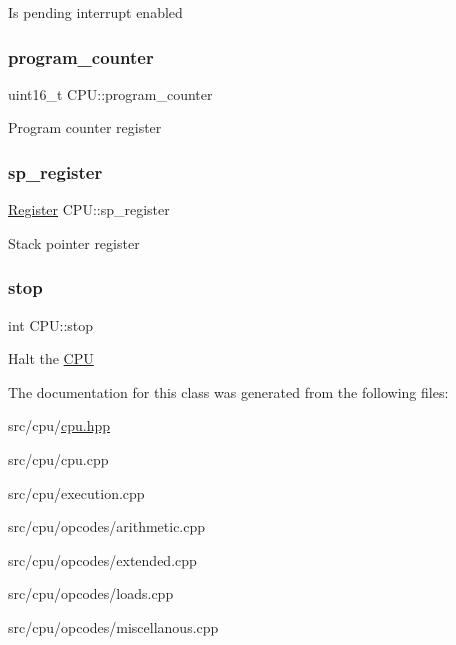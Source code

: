 Is pending interrupt enabled \mbox{\label{classCPU_a4714cc8907d24f008156b3c9ec20cd96}} 
\subsubsection{\texorpdfstring{program\+\_\+counter}{program\_counter}}
{\footnotesize\ttfamily uint16\+\_\+t C\+P\+U\+::program\+\_\+counter\hspace{0.3cm}{\ttfamily [private]}}

Program counter register \mbox{\label{classCPU_aa3b4070f5a781ad6131bc9912ef128a4}} 
\subsubsection{\texorpdfstring{sp\+\_\+register}{sp\_register}}
{\footnotesize\ttfamily \mbox{\hyperlink{unionRegister}{Register}} C\+P\+U\+::sp\+\_\+register\hspace{0.3cm}{\ttfamily [private]}}

Stack pointer register \mbox{\label{classCPU_a7dc961769c87974ae5384a70019addba}} 
\subsubsection{\texorpdfstring{stop}{stop}}
{\footnotesize\ttfamily int C\+P\+U\+::stop\hspace{0.3cm}{\ttfamily [private]}}

Halt the \mbox{\hyperlink{classCPU}{C\+PU}} 

The documentation for this class was generated from the following files\+:\begin{DoxyCompactItemize}
\item 
src/cpu/\mbox{\hyperlink{cpu_8hpp}{cpu.\+hpp}}\item 
src/cpu/cpu.\+cpp\item 
src/cpu/execution.\+cpp\item 
src/cpu/opcodes/arithmetic.\+cpp\item 
src/cpu/opcodes/extended.\+cpp\item 
src/cpu/opcodes/loads.\+cpp\item 
src/cpu/opcodes/miscellanous.\+cpp\end{DoxyCompactItemize}
